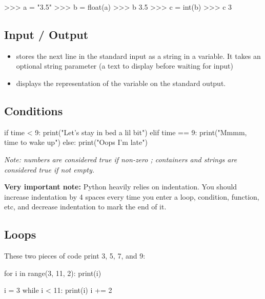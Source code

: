 \documentclass[twocolumn]{article}
\providecommand{\tightlist}{%
  \setlength{\itemsep}{0pt}\setlength{\parskip}{0pt}}
\begin{document}
\begin{python}
>>> a = "3.5"
>>> b = float(a)
>>> b
3.5
>>> c = int(b)
>>> c
3
\end{python}

\subsection{Input / Output}\label{input-output}

\begin{itemize}
\tightlist
\item
   stores the next line in the standard input as a
  string in a variable. It takes an optional string parameter (a text to
  display before waiting for input)
\item
   displays the representation of the variable on the
  standard output.
\end{itemize}

\subsection{Conditions}\label{conditions}

\begin{python}
if time < 9:
    print("Let's stay in bed a lil bit")
elif time == 9:
    print("Mmmm, time to wake up")
else:
    print("Oops I'm late")
\end{python}

\emph{Note: numbers are considered true if non-zero ; containers and
strings are considered true if not empty.}

\textbf{Very important note:} Python heavily relies on indentation. You should increase indentation by 4 spaces every time you enter a loop, condition, function, etc, and decrease indentation to mark the end of it.

\subsection{Loops}\label{loops}

These two pieces of code print 3, 5, 7, and 9:

\begin{python}
for i in range(3, 11, 2):
    print(i)
\end{python}

\begin{python}
i = 3
while i < 11:
    print(i)
    i += 2
\end{python}
\end{document}
